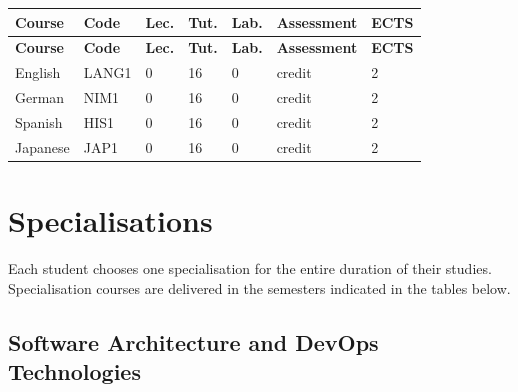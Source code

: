 \documentclass[12pt,a4paper]{article}
\newcommand{\thdrule}{\noalign{\global\setlength{\extrarowheight}{0pt}}}
\newcommand{\thdend}{\noalign{\global\setlength{\extrarowheight}{4pt}}}
\begin{document}
{\scriptsize
\begin{longtable}{m{5.5cm}m{0.8cm}m{1cm}m{1cm}m{1cm}m{1.7cm}m{0.7cm}}
\thdrule\toprule
\rowcolor{pjatkRed}
{\color{white}\footnotesize\textbf{\vphantom{Ag}Course}} & {\color{white}\footnotesize\textbf{\vphantom{Ag}Code}} & {\color{white}\footnotesize\textbf{\vphantom{Ag}Lec.}} & {\color{white}\footnotesize\textbf{\vphantom{Ag}Tut.}} & {\color{white}\footnotesize\textbf{\vphantom{Ag}Lab.}} & {\color{white}\footnotesize\textbf{\vphantom{Ag}Assessment}} & {\color{white}\footnotesize\textbf{\vphantom{Ag}ECTS}} \\
\midrule\thdend
\endfirsthead
\thdrule\toprule
\rowcolor{pjatkRed}
{\color{white}\footnotesize\textbf{\vphantom{Ag}Course}} & {\color{white}\footnotesize\textbf{\vphantom{Ag}Code}} & {\color{white}\footnotesize\textbf{\vphantom{Ag}Lec.}} & {\color{white}\footnotesize\textbf{\vphantom{Ag}Tut.}} & {\color{white}\footnotesize\textbf{\vphantom{Ag}Lab.}} & {\color{white}\footnotesize\textbf{\vphantom{Ag}Assessment}} & {\color{white}\footnotesize\textbf{\vphantom{Ag}ECTS}} \\
\midrule\thdend
\endhead
\rowcolor{tableRowLight} English & LANG1 & 0 & 16 & 0 & {\scriptsize credit} & 2 \\
\rowcolor{tableRowAlt} German & NIM1 & 0 & 16 & 0 & {\scriptsize credit} & 2 \\
\rowcolor{tableRowLight} Spanish & HIS1 & 0 & 16 & 0 & {\scriptsize credit} & 2 \\
\rowcolor{tableRowAlt} Japanese & JAP1 & 0 & 16 & 0 & {\scriptsize credit} & 2 \\
\bottomrule
\end{longtable}}



\newpage

\section{Specialisations}

Each student chooses one specialisation for the entire duration of their studies. Specialisation courses are delivered in the semesters indicated in the tables below.

\subsection*{Software Architecture and DevOps Technologies}
\end{document}
